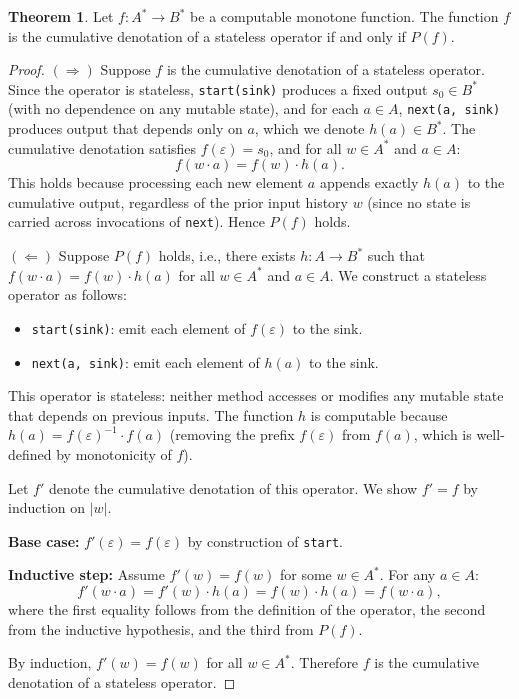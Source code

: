 \documentclass[11pt]{article}
\newcommand{\mnt}[1]{{\small\texttt{#1}}}
\theoremstyle{definition}
\newtheorem{myTheorem}[thm]{Theorem}{\bfseries}{}
\newcommand{\kstar}{^{\textstyle *}}
\begin{document}
\begin{myTheorem}
	\label{thm:stateless}
	Let $f: A\kstar \to B\kstar$ be a computable monotone function. The function $f$ is the cumulative denotation of a stateless operator if and only if $P(f)$.
\end{myTheorem}
\begin{proof}
	$(\Rightarrow)$ Suppose $f$ is the cumulative denotation of a stateless operator. Since the operator is stateless, \mnt{start(sink)} produces a fixed output $s_0 \in B\kstar$ (with no dependence on any mutable state), and for each $a \in A$, \mnt{next(a, sink)} produces output that depends only on $a$, which we denote $h(a) \in B\kstar$. The cumulative denotation satisfies $f(\varepsilon) = s_0$, and for all $w \in A\kstar$ and $a \in A$:
	\[
		f(w \cdot a) = f(w) \cdot h(a).
	\]
	This holds because processing each new element $a$ appends exactly $h(a)$ to the cumulative output, regardless of the prior input history $w$ (since no state is carried across invocations of \mnt{next}). Hence $P(f)$ holds.

	$(\Leftarrow)$ Suppose $P(f)$ holds, i.e., there exists $h: A \to B\kstar$ such that $f(w \cdot a) = f(w) \cdot h(a)$ for all $w \in A\kstar$ and $a \in A$. We construct a stateless operator as follows:
	\begin{itemize}
		\item \mnt{start(sink)}: emit each element of $f(\varepsilon)$ to the sink.
		\item \mnt{next(a, sink)}: emit each element of $h(a)$ to the sink.
	\end{itemize}
	This operator is stateless: neither method accesses or modifies any mutable state that depends on previous inputs. The function $h$ is computable because $h(a) = f(\varepsilon)^{-1} \cdot f(a)$ (removing the prefix $f(\varepsilon)$ from $f(a)$, which is well-defined by monotonicity of $f$).

	Let $f'$ denote the cumulative denotation of this operator. We show $f' = f$ by induction on $|w|$.

	\textbf{Base case:} $f'(\varepsilon) = f(\varepsilon)$ by construction of \mnt{start}.

	\textbf{Inductive step:} Assume $f'(w) = f(w)$ for some $w \in A\kstar$. For any $a \in A$:
	\[
		f'(w \cdot a) = f'(w) \cdot h(a) = f(w) \cdot h(a) = f(w \cdot a),
	\]
	where the first equality follows from the definition of the operator, the second from the inductive hypothesis, and the third from $P(f)$.

	By induction, $f'(w) = f(w)$ for all $w \in A\kstar$. Therefore $f$ is the cumulative denotation of a stateless operator.
\end{proof}
\end{document}
